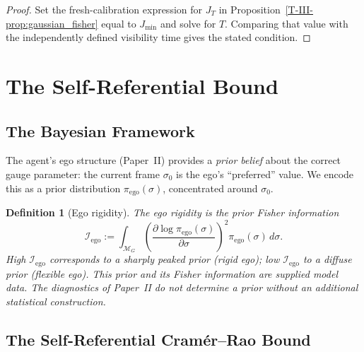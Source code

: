 \documentclass[12pt,a4paper,openany]{book}
\newtheorem{definition}[theorem]{Definition}
\begin{document}
\begin{proof}
Set the fresh-calibration expression for $J_T$ in
Proposition~\ref{T-III-prop:gaussian_fisher} equal to $J_{\min}$ and solve
for $T$.  Comparing that value with the independently defined
visibility time gives the stated condition.
\end{proof}

\section{The Self-Referential Bound}
\label{T-III-sec:SRCR}

\subsection{The Bayesian Framework}
\label{T-III-subsec:bayesian}

The agent's ego structure (Paper~II) provides a
\emph{prior belief} about the correct gauge parameter:
the current frame $\sigma_0$ is the ego's
``preferred'' value.
We encode this as a prior distribution
$\pi_{\mathrm{ego}}(\sigma)$, concentrated around
$\sigma_0$.

\begin{definition}[Ego rigidity]
\label{T-III-def:ego_rigidity}
The \emph{ego rigidity} is the prior Fisher information
\begin{equation}
\label{T-III-eq:ego_rigidity}
\mathcal{I}_{\mathrm{ego}}
:= \int_{\mathcal{M}_G}
\left(\frac{\partial \log \pi_{\mathrm{ego}}(\sigma)}
  {\partial \sigma}\right)^{\!2}
\pi_{\mathrm{ego}}(\sigma)\,d\sigma.
\end{equation}
High $\mathcal{I}_{\mathrm{ego}}$ corresponds to a
sharply peaked prior (rigid ego); low
$\mathcal{I}_{\mathrm{ego}}$ to a diffuse prior (flexible
ego).
This prior and its Fisher information are supplied model data.  The
diagnostics of Paper~II do not determine a prior without an additional
statistical construction.
\end{definition}

\subsection{The Self-Referential Cram\'{e}r--Rao Bound}
\label{T-III-subsec:SRCR}
\end{document}
